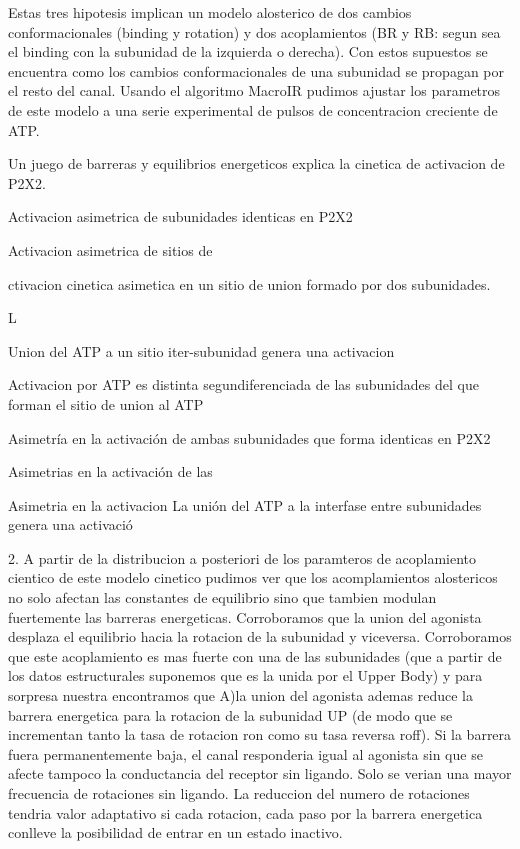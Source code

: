 \documentclass[a4paper,12pt]{article}
\begin{document}
		Estas tres hipotesis implican un modelo alosterico de dos cambios conformacionales (binding y rotation) y dos acoplamientos (BR y RB: segun sea el binding con la subunidad de la izquierda o derecha). 
		Con estos supuestos se encuentra como los cambios conformacionales de una subunidad se propagan por el resto del canal. 
		Usando el algoritmo MacroIR pudimos ajustar los parametros de este modelo a una serie experimental de pulsos de concentracion creciente de ATP. 
		
		Un juego de barreras y equilibrios energeticos explica la cinetica de activacion de P2X2. 
		
		Activacion asimetrica de subunidades identicas en P2X2
		
		Activacion asimetrica de sitios de 
		
		ctivacion cinetica asimetica en un sitio de union formado por dos subunidades. 
		
		L
		
		Union del ATP a un sitio iter-subunidad genera una activacion 
		
		Activacion por ATP es distinta segundiferenciada de las subunidades del que forman el sitio de union al ATP 
		
		Asimetría en la activación de ambas subunidades que forma 
		identicas en P2X2
		
		Asimetrias en la activación de las 
		
		Asimetria en la activacion 
		La unión 
		del ATP a la interfase entre subunidades genera una activació
		
		
		
		
		2. A partir de la distribucion a posteriori de los paramteros de acoplamiento cientico de  este modelo cinetico pudimos ver que los acomplamientos alostericos no solo afectan las constantes de equilibrio sino que tambien modulan fuertemente las barreras energeticas. Corroboramos que la union del agonista desplaza el equilibrio hacia la rotacion de la subunidad y viceversa. Corroboramos que este acoplamiento es mas fuerte con una de las subunidades (que a partir de los datos estructurales suponemos que es la unida por el Upper Body) y para sorpresa nuestra encontramos que 
		A)la union del agonista ademas reduce la barrera energetica para la rotacion de la subunidad UP (de modo que se incrementan tanto la tasa de rotacion ron como su tasa reversa roff). 
		Si la barrera fuera permanentemente baja, el canal responderia igual al agonista sin que se afecte tampoco la conductancia del receptor sin ligando. Solo se verian una mayor frecuencia de rotaciones sin ligando. 
		La reduccion del numero de rotaciones tendria valor adaptativo si cada rotacion, cada paso por la barrera energetica conlleve la posibilidad de entrar en un estado inactivo. 
		
\end{document}
